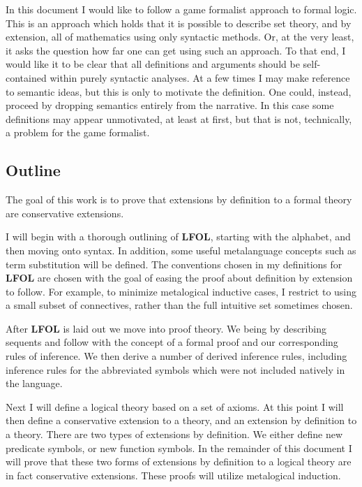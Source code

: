 \documentclass[12pt]{article}
\theoremstyle{break}
\theoremstyle{break}
\theoremstyle{break}
\theoremstyle{break}
\begin{document}
In this document I would like to follow a game formalist approach to formal logic.
This is an approach which holds that it is possible to describe set theory, and by extension, all of mathematics using only syntactic methods.
Or, at the very least, it asks the question how far one can get using such an approach.
To that end, I would like it to be clear that all definitions and arguments should be self-contained within purely syntactic analyses.
At a few times I may make reference to semantic ideas, but this is only to motivate the definition.
One could, instead, proceed by dropping semantics entirely from the narrative.
In this case some definitions may appear unmotivated, at least at first, but that is not, technically, a problem for the game formalist.

\subsection{Outline}

The goal of this work is to prove that extensions by definition to a formal theory are conservative extensions.

I will begin with a thorough outlining of \textbf{LFOL}, starting with the alphabet, and then moving onto syntax.
In addition, some useful metalanguage concepts such as term substitution will be defined.
The conventions chosen in my definitions for \textbf{LFOL} are chosen with the goal of easing the proof about definition by extension to follow.
For example, to minimize metalogical inductive cases, I restrict to using a small subset of connectives, rather than the full intuitive set sometimes chosen.

After \textbf{LFOL} is laid out we move into proof theory.
We being by describing sequents and follow with the concept of a formal proof and our corresponding rules of inference.
We then derive a number of derived inference rules, including inference rules for the abbreviated symbols which were not included natively in the language.

Next I will define a logical theory based on a set of axioms.
At this point I will then define a conservative extension to a theory, and an extension by definition to a theory.
There are two types of extensions by definition.
We either define new predicate symbols, or new function symbols.
In the remainder of this document I will prove that these two forms of extensions by definition to a logical theory are in fact conservative extensions.
These proofs will utilize metalogical induction.
\end{document}
